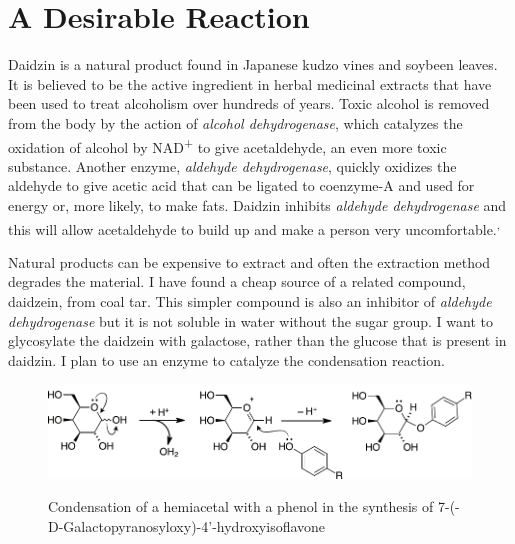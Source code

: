 \documentclass[]{tufte-handout}
\begin{document}
\section{A Desirable Reaction}

Daidzin is a natural product found in Japanese kudzo vines and soybeen leaves. It is believed to be the active ingredient in herbal medicinal extracts that have been used to treat alcoholism over hundreds of years. Toxic alcohol is removed from the body by the action of \emph{alcohol dehydrogenase}, which cata\-lyz\-es the oxidation of alcohol by NAD\textsuperscript{+} to give acetaldehyde, an even more toxic substance. Another enzyme, \emph{aldehyde de\-hy\-drog\-en\-ase}, quick\-ly oxid\-izes the aldehyde to give acetic acid that can be ligated to coenzyme-A and used for energy or, more likely, to make fats. Daidzin inhibits \emph{aldehyde de\-hy\-drog\-en\-ase} and this will allow acetaldehyde to build up and make a person very uncomfortable.\textsuperscript{,}
 

Natural products can be expensive to extract and often the extraction method degrades the material. I have found a cheap source of a related compound, daidzein, from coal tar. This simpler compound is also an inhib\-itor of \emph{aldehyde de\-hy\-drog\-en\-ase} but it is not soluble in water without the sugar group. I want to glycosylate the daidzein with galactose, rather than the glucose that is present in daidzin. I plan to use an enzyme to catalyze the condensation reaction.

\begin{figure}[h!]

  \caption[0mm]{Condensation of a hemiacetal with a phenol in the synthesis of  7-(\textbeta -D-Galactopyranosyloxy)-4'-hydroxyisoflavone} 
  \vspace{2mm}
    \centering
  \includegraphics[scale=0.6]{reaction1.pdf}
  \vspace{5mm}
  \label{fig:fig2}
\end{figure}
\end{document}
